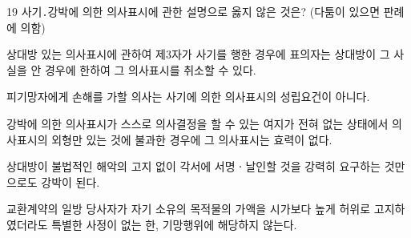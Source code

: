 \begin{question}{19}
사기․강박에 의한 의사표시에 관한 설명으로 옳지 않은 것은? (다툼이 있으면 판례에 의함)
\begin{choices}
  \item 상대방 있는 의사표시에 관하여 제3자가 사기를 행한 경우에 표의자는 상대방이 그 사실을 안 경우에 한하여 그 의사표시를 취소할 수 있다.
  \item 피기망자에게 손해를 가할 의사는 사기에 의한 의사표시의 성립요건이 아니다.
  \item 강박에 의한 의사표시가 스스로 의사결정을 할 수 있는 여지가 전혀 없는 상태에서 의사표시의 외형만 있는 것에 불과한 경우에 그 의사표시는 효력이 없다.
  \item 상대방이 불법적인 해악의 고지 없이 각서에 서명ㆍ날인할 것을 강력히 요구하는 것만으로도 강박이 된다.
  \item 교환계약의 일방 당사자가 자기 소유의 목적물의 가액을 시가보다 높게 허위로 고지하였더라도 특별한 사정이 없는 한, 기망행위에 해당하지 않는다.
\end{choices}
\end{question}
